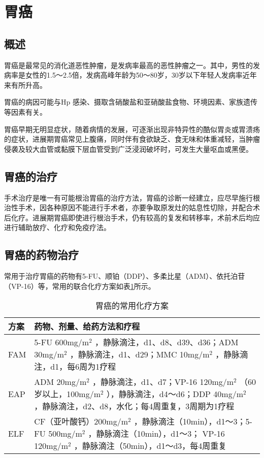 \section{胃癌}

\subsection{概述}

胃癌是最常见的消化道恶性肿瘤，是发病率最高的恶性肿瘤之一。其中，男性的发病率是女性的1.5～2.5倍，发病高峰年龄为50～80岁，30岁以下年轻人发病率近年来有所升高。

胃癌的病因可能与{Hp}
感染、摄取含硝酸盐和亚硝酸盐食物、环境因素、家族遗传等因素有关。

胃癌早期无明显症状，随着病情的发展，可逐渐出现非特异性的酷似胃炎或胃溃疡的症状，进展期胃癌常见上腹痛，同时伴有食欲缺乏、食无味和体重减轻，当肿瘤侵袭及较大血管或黏膜下层血管受到广泛浸润破坏时，可发生大量呕血或黑便。

\subsection{胃癌的治疗}

手术治疗是唯一有可能根治胃癌的治疗方法，胃癌的诊断一经建立，应尽早施行根治性手术，因各种原因不能进行手术者，亦要争取原发灶的姑息性切除，并配合术后化疗。进展期胃癌即使进行根治手术，仍有较高的复发和转移率，术前术后均应进行辅助放疗、化疗和免疫疗法。

\subsection{胃癌的药物治疗}

常用于治疗胃癌的药物有5-FU、顺铂（DDP）、多柔比星（ADM）、依托泊苷（VP-16）等，常用的联合化疗方案如表\ref{tab17-4}所示。

\begin{longtable}[]{lp{8cm}}
    \caption{胃癌的常用化疗方案}
    \label{tab17-4}\\
\toprule
方案 & 药物、剂量、给药方法和疗程\tabularnewline
\midrule
\endhead
FAM & 5-FU 600mg/m$^2$ ，静脉滴注，d1、d8、d39、d36；ADM 30mg/m$^2$
，静脉滴注，d1、d29；MMC 10mg/m$^2$
，静脉滴注，d1，每6周为1疗程\tabularnewline
EAP &  ADM 20mg/m$^2$ ，静脉滴注，d1、d7；VP-16
120mg/m$^2$ （60岁以上，100mg/m$^2$
），静脉滴注，d4～d6；DDP 40mg/m$^2$
，静脉滴注，d2、d8，水化；每4周重复，3周期为1疗程\tabularnewline
ELF &  CF（亚叶酸钙）200mg/m$^2$
，静脉滴注（10min），d1～3；5-FU 500mg/m$^2$
，静脉滴注（10min），d1～3； VP-16 120mg/m$^2$
，静脉滴注（50min），d1～d3，每4周重复\tabularnewline
\bottomrule
\end{longtable}

